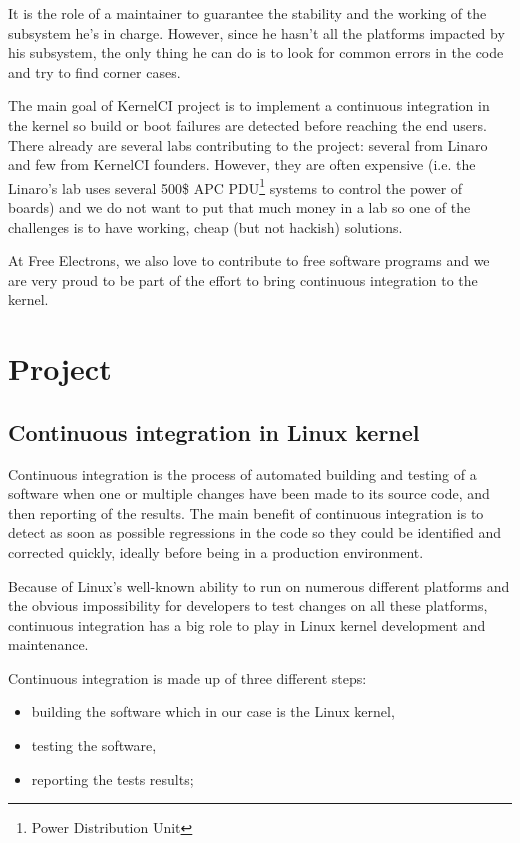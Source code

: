 It is the role of a maintainer to guarantee the stability and the working of the subsystem he's in charge. However, since he hasn't all the platforms impacted by his subsystem, the only thing he can do is to look for common errors in the code and try to find corner cases.

The main goal of KernelCI project is to implement a continuous integration in the kernel so build or boot failures are detected before reaching the end users. There already are several labs contributing to the project: several from Linaro and few from KernelCI founders. However, they are often expensive (i.e. the Linaro's lab uses several 500\$ APC PDU\footnote{Power Distribution Unit} systems to control the power of boards) and we do not want to put that much money in a lab so one of the challenges is to have working, cheap (but not hackish) solutions.

At Free Electrons, we also love to contribute to free software programs and we are very proud to be part of the effort to bring continuous integration to the kernel.

\section{Project}
\subsection{Continuous integration in Linux kernel}

Continuous integration is the process of automated building and testing of a software when one or multiple changes have been made to its source code, and then reporting of the results. The main benefit of continuous integration is to detect as soon as possible regressions in the code so they could be identified and corrected quickly, ideally before being in a production environment.

Because of Linux's well-known ability to run on numerous different platforms and the obvious impossibility for developers to test changes on all these platforms, continuous integration has a big role to play in Linux kernel development and maintenance.

Continuous integration is made up of three different steps:
\begin{itemize}
  \item building the software which in our case is the Linux kernel,
  \item testing the software,
  \item reporting the tests results;
\end{itemize}

